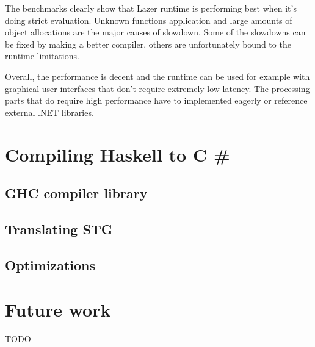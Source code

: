 \documentclass[en]{pracamgr}
\newcommand{\shrp}{%
  {\fontfamily{ppl}\selectfont\#%
  }}
\begin{document}
The benchmarks clearly show that Lazer runtime is performing
best when it's doing strict evaluation.
Unknown functions application and large amounts of object allocations
are the major causes of slowdown.
Some of the slowdowns can be fixed by making a better compiler,
others are unfortunately bound to the runtime limitations.

Overall, the performance is decent and the runtime can be used
for example with graphical user interfaces that don't require
extremely low latency. The processing parts that do
require high performance have to implemented eagerly
or reference external .NET libraries.

\chapter{Compiling Haskell to C\shrp{}}\label{r:compiler}

\section{GHC compiler library}

\section{Translating STG}

\section{Optimizations}

\chapter{Future work}\label{r:future}

TODO
\end{document}

